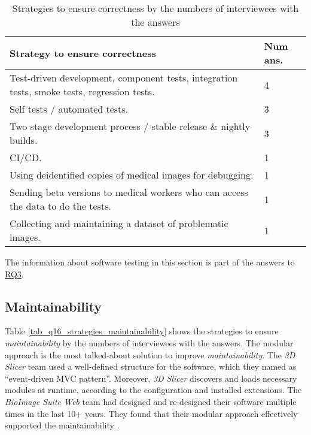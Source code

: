 \begin{table}[H]
\centering
\hspace*{-1.5cm}\begin{tabular}{ll}
\hline
Strategy to ensure correctness & Num ans. \\ \hline
Test-driven development, component tests, integration tests, smoke tests, regression tests. & 4 \\
Self tests / automated tests. & 3 \\
Two stage development process / stable release \& nightly builds. & 3 \\
CI/CD. & 1 \\
Using deidentified copies of medical images for debugging. & 1 \\
Sending beta versions to medical workers who can access the data to do the tests. & 1 \\
Collecting and maintaining a dataset of problematic images. & 1 \\ \hline
\end{tabular}
\caption{\label{tab_q15_strategies_correctness}Strategies to ensure correctness by the numbers of interviewees with the answers}
\end{table}

The information about software testing in this section is part of the answers to \hyperlink{rq3}{RQ3}.

\subsection{Maintainability}
\label{sec_interview_maintainability}

Table \ref{tab_q16_strategies_maintainability} shows the strategies to ensure \textit{maintainability} by the numbers of interviewees with the answers. The modular approach is the most talked-about solution to improve \textit{maintainability}. The \textit{3D Slicer} team used a well-defined structure for the software, which they named as ``event-driven MVC pattern''. Moreover, \textit{3D Slicer} discovers and loads necessary modules at runtime, according to the configuration and installed extensions. The \textit{BioImage Suite Web} team had designed and re-designed their software multiple times in the last 10+
years. They found that their modular approach effectively supported the maintainability \cite{Joshi2011}. 

